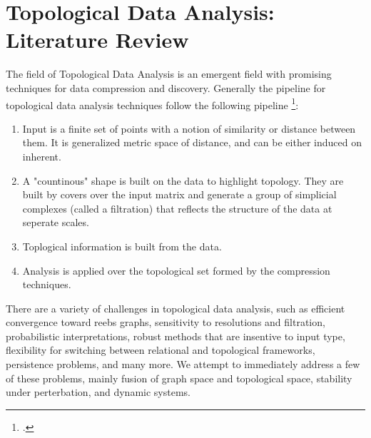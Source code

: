 \section{Topological Data Analysis: Literature Review}
The field of Topological Data Analysis is an emergent field with promising techniques for data compression and discovery. Generally the pipeline for topological data analysis techniques follow the following pipeline \footcite{Michel2017}:
\begin{enumerate}
\item Input is a finite set of points with a notion of similarity or distance between them. It is generalized metric space of distance, and can be either induced on inherent. 
\item A "countinous" shape is built on the data to highlight topology. They are built by covers over the input matrix and generate a group of simplicial complexes (called a filtration) that reflects the structure of the data at seperate scales.
\item Toplogical information is built from the data.
\item Analysis is applied over the topological set formed by the compression techniques.
\end{enumerate}

There are a variety of challenges in topological data analysis, such as efficient convergence toward reebs graphs, sensitivity to resolutions and filtration, probabilistic interpretations, robust methods that are insentive to input type, flexibility for switching between relational and topological frameworks, persistence problems, and many more. We attempt to immediately address a few of these problems, mainly fusion of graph space and topological space, stability under perterbation, and dynamic systems.
